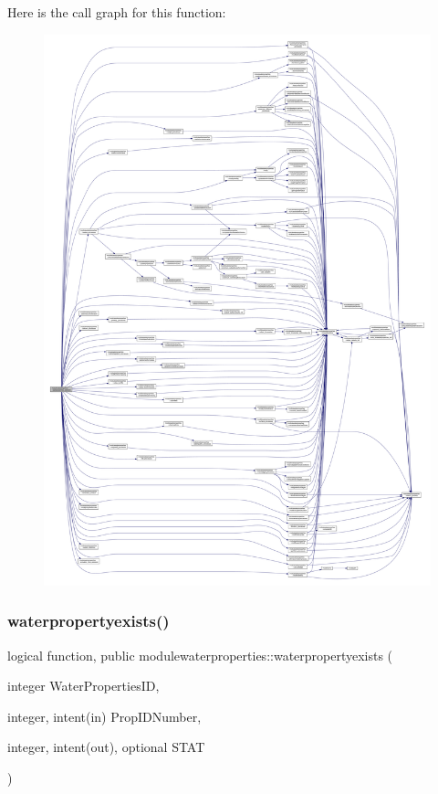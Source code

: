 Here is the call graph for this function\+:\nopagebreak
\begin{figure}[H]
\begin{center}
\leavevmode
\includegraphics[width=350pt]{namespacemodulewaterproperties_aa86f63313e6563018f6b05938306a23d_cgraph}
\end{center}
\end{figure}
\mbox{\label{namespacemodulewaterproperties_a2c7278a1e0767b9b9c5419a5b34299f5}} 
\subsubsection{\texorpdfstring{waterpropertyexists()}{waterpropertyexists()}}
{\footnotesize\ttfamily logical function, public modulewaterproperties\+::waterpropertyexists (\begin{DoxyParamCaption}\item[{integer}]{Water\+Properties\+ID,  }\item[{integer, intent(in)}]{Prop\+I\+D\+Number,  }\item[{integer, intent(out), optional}]{S\+T\+AT }\end{DoxyParamCaption})}

